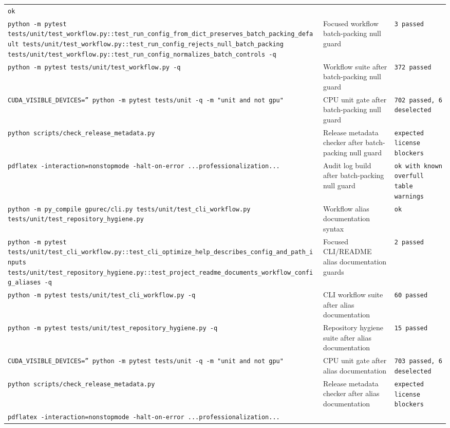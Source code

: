 \documentclass[11pt]{article}
\begin{document}
\begin{center}
\begin{tabular}{lll}
\texttt{ok} \\
\texttt{python -m pytest tests/unit/test\_workflow.py::test\_run\_config\_from\_dict\_preserves\_batch\_packing\_default tests/unit/test\_workflow.py::test\_run\_config\_rejects\_null\_batch\_packing tests/unit/test\_workflow.py::test\_run\_config\_normalizes\_batch\_controls -q} &
Focused workflow batch-packing null guard &
\texttt{3 passed} \\
\texttt{python -m pytest tests/unit/test\_workflow.py -q} &
Workflow suite after batch-packing null guard &
\texttt{372 passed} \\
\texttt{CUDA\_VISIBLE\_DEVICES='' python -m pytest tests/unit -q -m "unit and not gpu"} &
CPU unit gate after batch-packing null guard &
\texttt{702 passed, 6 deselected} \\
\texttt{python scripts/check\_release\_metadata.py} &
Release metadata checker after batch-packing null guard &
\texttt{expected license blockers} \\
\texttt{pdflatex -interaction=nonstopmode -halt-on-error ...professionalization...} &
Audit log build after batch-packing null guard &
\texttt{ok with known overfull table warnings} \\
\texttt{python -m py\_compile gpurec/cli.py tests/unit/test\_cli\_workflow.py tests/unit/test\_repository\_hygiene.py} &
Workflow alias documentation syntax &
\texttt{ok} \\
\texttt{python -m pytest tests/unit/test\_cli\_workflow.py::test\_cli\_optimize\_help\_describes\_config\_and\_path\_inputs tests/unit/test\_repository\_hygiene.py::test\_project\_readme\_documents\_workflow\_config\_aliases -q} &
Focused CLI/README alias documentation guards &
\texttt{2 passed} \\
\texttt{python -m pytest tests/unit/test\_cli\_workflow.py -q} &
CLI workflow suite after alias documentation &
\texttt{60 passed} \\
\texttt{python -m pytest tests/unit/test\_repository\_hygiene.py -q} &
Repository hygiene suite after alias documentation &
\texttt{15 passed} \\
\texttt{CUDA\_VISIBLE\_DEVICES='' python -m pytest tests/unit -q -m "unit and not gpu"} &
CPU unit gate after alias documentation &
\texttt{703 passed, 6 deselected} \\
\texttt{python scripts/check\_release\_metadata.py} &
Release metadata checker after alias documentation &
\texttt{expected license blockers} \\
\texttt{pdflatex -interaction=nonstopmode -halt-on-error ...professionalization...} &

\end{tabular}
\end{center}
\end{document}
